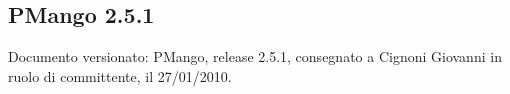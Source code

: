 \subsection{PMango 2.5.1}
Documento versionato: PMango, release 2.5.1, consegnato a Cignoni
Giovanni in ruolo di committente, il 27/01/2010.
